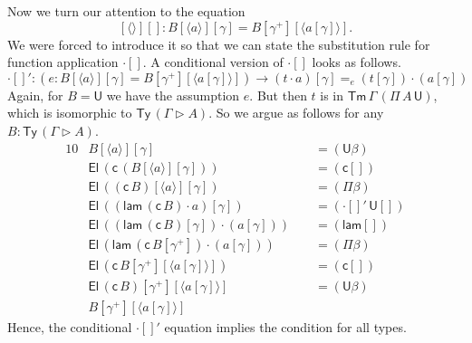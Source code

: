 \documentclass[a4paper,UKenglish,cleveref, autoref, thm-restate]{lipics-v2021}
\newcommand{\ra}{\rightarrow}
\newcommand{\Ty}{\mathsf{Ty}}
\newcommand{\Tm}{\mathsf{Tm}}
\newcommand{\ext}{\mathop{\triangleright}}
\newcommand{\lam}{\mathsf{lam}}
\newcommand{\U}{\mathsf{U}}
\newcommand{\El}{\mathsf{El}}
\newcommand{\cd}{\mathsf{c}}
\begin{document}
Now we turn our attention to the equation
\[
  [\langle\rangle][] : B[\langle a\rangle][\gamma] = B[\gamma^+][\langle a[\gamma]\rangle].
\]
We were forced to introduce it so that we can state the substitution
rule for function application $\cdot[]$. A conditional version of
$\cdot[]$ looks as follows.
\[
\cdot[]' : (e : B[\langle a\rangle][\gamma] = B[\gamma^+][\langle a[\gamma]\rangle])\ra(t\cdot a)[\gamma] =_e (t[\gamma])\cdot(a[\gamma])
\]
Again, for $B = \U$ we have the assumption $e$. But then $t$ is in
$\Tm\,\Gamma\,(\Pi\,A\,\U)$, which is isomorphic to $\Ty\,(\Gamma\ext
A)$. So we argue as follows for any $B : \Ty\,(\Gamma\ext A)$.
\begin{alignat*}{10}
  & B[\langle a\rangle][\gamma] && {=}(\U\beta) \\
  & \El\,(\cd\,(B[\langle a\rangle][\gamma])) && {=}(\cd[]) \\
  & \El\,((\cd\,B)[\langle a\rangle][\gamma]) && {=}(\Pi\beta) \\
  & \El\,((\lam\,(\cd\,B)\cdot a)[\gamma]) && {=}(\cdot[]'\,\U[]) \\
  & \El\,((\lam\,(\cd\,B)[\gamma])\cdot (a[\gamma]))\,\, && {=}(\lam[]) \\
  & \El\,(\lam\,(\cd\,B[\gamma^+])\cdot (a[\gamma])) && {=}(\Pi\beta) \\
  & \El\,(\cd\,B[\gamma^+][\langle a[\gamma]\rangle]) && {=}(\cd[]) \\
  & \El\,(\cd\,B)[\gamma^+][\langle a[\gamma]\rangle] && {=}(\U\beta) \\
  & B[\gamma^+][\langle a[\gamma]\rangle]
\end{alignat*}
Hence, the conditional $\cdot[]'$ equation implies the condition for
all types.
\end{document}
